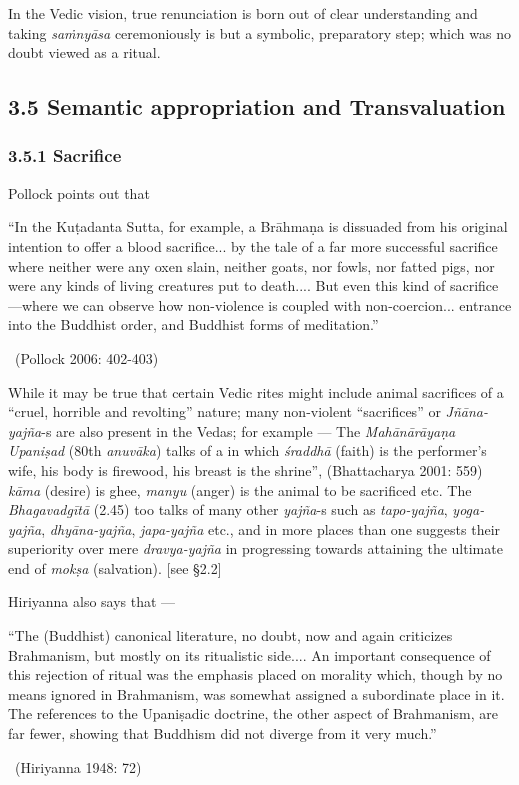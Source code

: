 In the Vedic vision, true renunciation is born out of clear understanding and taking \textit{saṁnyāsa} ceremoniously is but a symbolic, preparatory step; which was no doubt viewed as a ritual.


\subsection*{3.5 Semantic appropriation and Transvaluation}

\subsubsection*{3.5.1 Sacrifice}

Pollock points out that

\begin{myquote}
“In the Kuṭadanta Sutta, for example, a Brāhmaṇa is dissuaded from his original intention to offer a blood sacrifice... by the tale of a far more successful sacrifice where neither were any oxen slain, neither goats, nor fowls, nor fatted pigs, nor were any kinds of living creatures put to death.... But even this kind of sacrifice—where we can observe how non-violence is coupled with non-coercion... entrance into the Buddhist order, and Buddhist forms of meditation.” 

~\hfill (Pollock 2006: 402-403)
\end{myquote}

While it may be true that certain Vedic rites might include animal sacrifices of a “cruel, horrible and revolting” nature; many non-violent “sacrifices” or \textit{Jñāna-yajña}-s are also present in the Vedas; for example — The \textit{Mahānārāyaṇa Upaniṣad} (80th \textit{anuvāka}) talks of a  in which \textit{śraddhā} (faith) is the performer’s wife, his body is firewood, his breast is the shrine”, (Bhattacharya 2001: 559) \textit{kāma }(desire) is ghee, \textit{manyu} (anger) is the animal to be sacrificed etc. The \textit{Bhagavadgītā} (2.45) too talks of many other \textit{yajña}-s such as \textit{tapo-yajña}, \textit{yoga-yajña}, \textit{dhyāna-yajña}, \textit{japa-yajña} etc., and in more places than one suggests their superiority over mere \textit{dravya-yajña} in progressing towards attaining the ultimate end of \textit{mokṣa} (salvation). [see §2.2]

Hiriyanna also says that —

\begin{myquote}
“The (Buddhist) canonical literature, no doubt, now and again criticizes Brahmanism, but mostly on its ritualistic side.... An important consequence of this rejection of ritual was the emphasis placed on morality which, though by no means ignored in Brahmanism, was somewhat assigned a subordinate place in it. The references to the Upaniṣadic doctrine, the other aspect of Brahmanism, are far fewer, showing that Buddhism did not diverge from it very much.” 

~\hfill (Hiriyanna 1948: 72)
\end{myquote}

